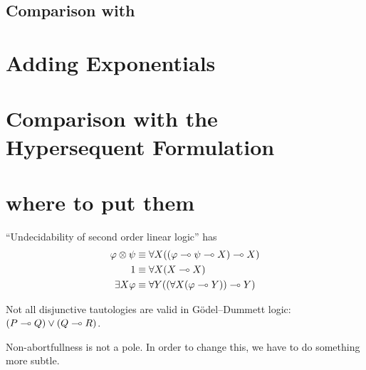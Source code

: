 \subsection{Comparison with \FLe}

\section{Adding Exponentials}

\section{Comparison with the Hypersequent Formulation}


\section*{where to put them}

``Undecidability of second order linear logic'' has
\begin{align*}
 \varphi\otimes \psi&\equiv \forall X((\varphi\multimap\psi\multimap X)\multimap X) \\
 {1}      &\equiv \forall X(X\multimap X)\\
 \exists X\varphi   &\equiv \forall Y((\forall X(\varphi\multimap Y))\multimap Y)
\end{align*}

Not all disjunctive tautologies are valid in G\"odel--Dummett logic:
$(P\multimap Q)\lor(Q\multimap R)$.

Non-abortfullness is not a pole.
In order to change this, we have to do something more subtle.

